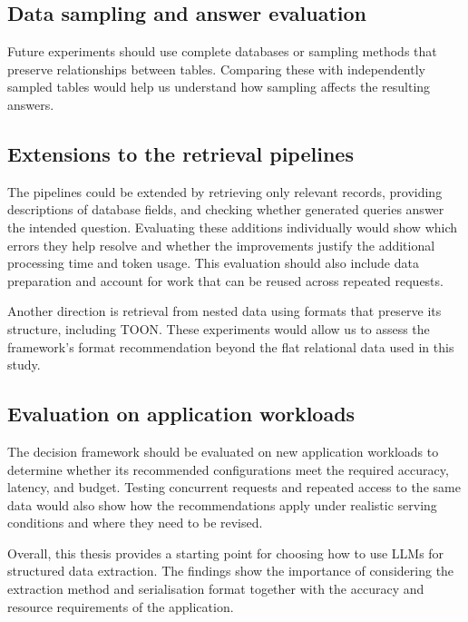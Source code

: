 \subsection{Data sampling and answer evaluation}

Future experiments should use complete databases or sampling methods that preserve relationships between
tables. Comparing these with independently sampled tables would help us understand how sampling affects the
resulting answers.

\subsection{Extensions to the retrieval pipelines}

The pipelines could be extended by retrieving only relevant records, providing descriptions of database
fields, and checking whether generated queries answer the intended question. Evaluating these additions
individually would show which errors they help resolve and whether the improvements justify the additional
processing time and token usage. This evaluation should also include data preparation and account for work
that can be reused across repeated requests.

Another direction is retrieval from nested data using formats that preserve its structure, including TOON.
These experiments would allow us to assess the framework's format recommendation beyond the flat relational
data used in this study.

\subsection{Evaluation on application workloads}

The decision framework should be evaluated on new application workloads to determine whether its recommended
configurations meet the required accuracy, latency, and budget. Testing concurrent requests and repeated
access to the same data would also show how the recommendations apply under realistic serving conditions and
where they need to be revised.

Overall, this thesis provides a starting point for choosing how to use LLMs for structured data extraction.
The findings show the importance of considering the extraction method and serialisation format together with
the accuracy and resource requirements of the application.
